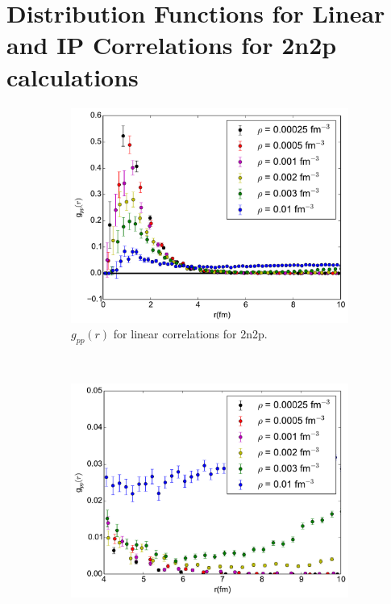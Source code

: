 \documentclass[12pt]{article}
\begin{document}
\section{Distribution Functions for Linear and IP Correlations for 2n2p calculations}
\begin{figure}[h!]
   \centering
   \begin{subfigure}{0.49\textwidth}
      \includegraphics[width=\textwidth]{../gpp_lin_alpha.pdf}
      \caption{$g_{pp}(r)$ for linear correlations for 2n2p.}
   \end{subfigure}
   ~
   \begin{subfigure}{0.49\textwidth}
      \includegraphics[width=\textwidth]{../gpp_lin_small_alpha.pdf}

\end{subfigure}
\end{figure}
\end{document}
